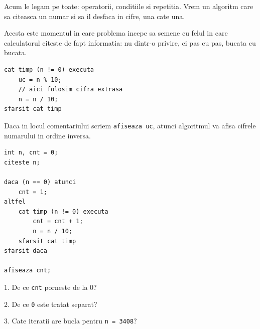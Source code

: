 
\begin{missionbox}
  Acum le legam pe toate: operatorii, conditiile si repetitia. Vrem un algoritm care sa citeasca un numar si sa il desfaca in cifre, una cate una.

  Acesta este momentul in care problema incepe sa semene cu felul in care calculatorul citeste de fapt informatia: nu dintr-o privire, ci pas cu pas, bucata cu bucata.
\end{missionbox}

\begin{conceptbox}
\begin{lstlisting}[style=codequest]
cat timp (n != 0) executa
    uc = n % 10;
    // aici folosim cifra extrasa
    n = n / 10;
sfarsit cat timp
\end{lstlisting}
\end{conceptbox}

\begin{guidebox}
  Daca in locul comentariului scriem \texttt{afiseaza uc}, atunci algoritmul va afisa cifrele numarului in ordine inversa.
\end{guidebox}

\newpage
{}

\begin{examplebox}
\begin{lstlisting}[style=codequest]
int n, cnt = 0;
citeste n;

daca (n == 0) atunci
    cnt = 1;
altfel
    cat timp (n != 0) executa
        cnt = cnt + 1;
        n = n / 10;
    sfarsit cat timp
sfarsit daca

afiseaza cnt;
\end{lstlisting}
\end{examplebox}

\begin{guidebox}
  1. De ce \texttt{cnt} porneste de la 0?

  2. De ce \texttt{0} este tratat separat?

  3. Cate iteratii are bucla pentru \texttt{n = 3408}?
\end{guidebox}

\newpage
{}

